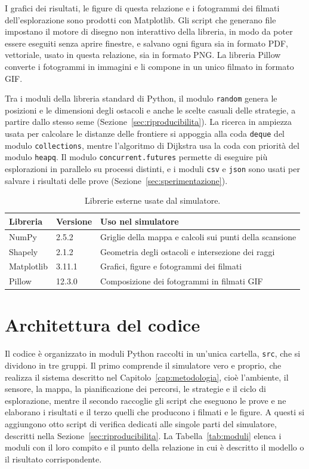 I grafici dei risultati, le figure di questa relazione e i fotogrammi dei filmati dell'esplorazione sono prodotti con Matplotlib. Gli script che generano file impostano il motore di disegno non interattivo della libreria, in modo da poter essere eseguiti senza aprire finestre, e salvano ogni figura sia in formato PDF, vettoriale, usato in questa relazione, sia in formato PNG. La libreria Pillow converte i fotogrammi in immagini e li compone in un unico filmato in formato GIF.

Tra i moduli della libreria standard di Python, il modulo \texttt{random} genera le posizioni e le dimensioni degli ostacoli e anche le scelte casuali delle strategie, a partire dallo stesso seme (Sezione~\ref{sec:riproducibilita}). La ricerca in ampiezza usata per calcolare le distanze delle frontiere si appoggia alla coda \texttt{deque} del modulo \texttt{collections}, mentre l'algoritmo di Dijkstra usa la coda con priorità del modulo \texttt{heapq}. Il modulo \texttt{concurrent.futures} permette di eseguire più esplorazioni in parallelo su processi distinti, e i moduli \texttt{csv} e \texttt{json} sono usati per salvare i risultati delle prove (Sezione~\ref{sec:sperimentazione}).

\begin{table}[!htb]
    \centering
    \small
    \begin{tabular}{@{}llp{}@{}}
        \toprule
        Libreria & Versione & Uso nel simulatore \\
        \midrule
        NumPy & 2.5.2 & Griglie della mappa e calcoli sui punti della scansione \\
        Shapely & 2.1.2 & Geometria degli ostacoli e intersezione dei raggi \\
        Matplotlib & 3.11.1 & Grafici, figure e fotogrammi dei filmati \\
        Pillow & 12.3.0 & Composizione dei fotogrammi in filmati GIF \\
        \bottomrule
    \end{tabular}
    \caption{Librerie esterne usate dal simulatore.}
    \label{tab:librerie}
\end{table}

\section{Architettura del codice}
\label{sec:architettura}

Il codice è organizzato in moduli Python raccolti in un'unica cartella, \texttt{src}, che si dividono in tre gruppi. Il primo comprende il simulatore vero e proprio, che realizza il sistema descritto nel Capitolo~\ref{cap:metodologia}, cioè l'ambiente, il sensore, la mappa, la pianificazione dei percorsi, le strategie e il ciclo di esplorazione, mentre il secondo raccoglie gli script che eseguono le prove e ne elaborano i risultati e il terzo quelli che producono i filmati e le figure. A questi si aggiungono otto script di verifica dedicati alle singole parti del simulatore, descritti nella Sezione~\ref{sec:riproducibilita}. La Tabella~\ref{tab:moduli} elenca i moduli con il loro compito e il punto della relazione in cui è descritto il modello o il risultato corrispondente.


